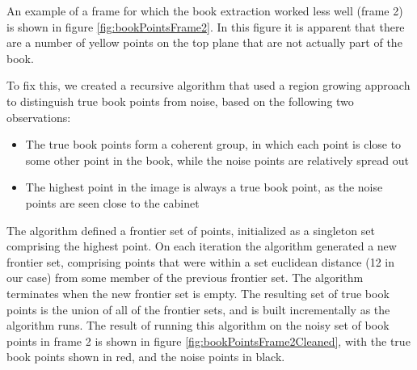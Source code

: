 An example of a frame for which the book extraction worked less well (frame 2) is shown in figure \ref{fig:bookPointsFrame2}. In this figure it is apparent that there are a number of yellow points on the top plane that are not actually part of the book.

To fix this, we created a recursive algorithm that used a region growing approach to distinguish true book points from noise, based on the following two observations:

\begin{itemize}
	\item The true book points form a coherent group, in which each point is close to some other point in the book, while the noise points are relatively spread out
	\item The highest point in the image is always a true book point, as the noise points are seen close to the cabinet
\end{itemize}

The algorithm defined a frontier set of points, initialized as a singleton set comprising the highest point. On each iteration the algorithm generated a new frontier set, comprising points that were within a set euclidean distance (12 in our case) from some member of the previous frontier set. The algorithm terminates when the new frontier set is empty. The resulting set of true book points is the union of all of the frontier sets, and is built incrementally as the algorithm runs. The result of running this algorithm on the noisy set of book points in frame 2 is shown in figure \ref{fig:bookPointsFrame2Cleaned}, with the true book points shown in red, and the noise points in black.

